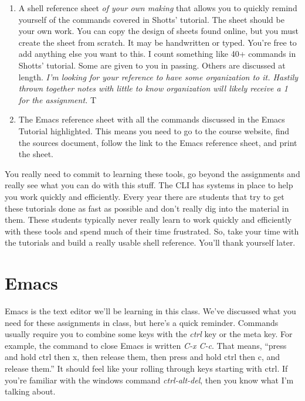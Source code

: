\documentclass[]{tufte-handout}
\begin{document}
\begin{enumerate}
\item A shell reference sheet \textit{of your own making} that allows you to quickly remind yourself of the commands covered in Shotts' tutorial. The sheet should be your own work. You can copy the design of sheets found online, but you must create the sheet from scratch. It may be handwritten or typed. You're free to add anything else you want to this. I count something like 40+ commands in Shotts' tutorial. Some are given to you in passing. Others are discussed at length.  \textit{I'm looking for your reference to have some organization to it. Hastily thrown together notes with little to know organization will likely receive a 1 for the assignment.} T 

\item The Emacs reference sheet with all the commands discussed in the Emacs Tutorial highlighted. This means you need to go to the course website, find the sources document, follow the link to the Emacs reference sheet, and print the sheet.   
\end{enumerate}

You really need to commit to learning these tools, go beyond the assignments and really see what you can do with this stuff. The CLI has systems in place to help you work quickly and efficiently. Every year there are students that try to get these tutorials done as fast as possible and don't really dig into the material in them. These students typically never really learn to work quickly and efficiently with these tools and spend much of their time frustrated. So, take your time with the tutorials and build a really usable shell reference. You'll thank yourself later. 

\section{Emacs}

Emacs is the text editor we'll be learning in this class. We've discussed what you need for these assignments in class, but here's a quick reminder. Commands usually require you to combine some keys with the \textit{ctrl} key or the meta key. For example, the command to close Emacs is written \textit{C-x C-c}. That means, ``press and hold ctrl then x, then release them, then press and hold ctrl then c, and release them.''  It should feel like your rolling through keys starting with ctrl.  If you're familiar with the windows command \textit{ctrl-alt-del}, then you know what I'm talking about. 
\end{document}
